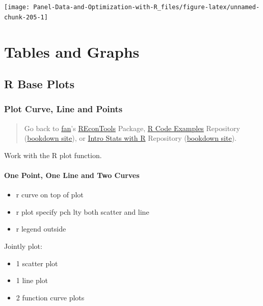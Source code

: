 \documentclass[
]{book}
\providecommand{\tightlist}{%
  \setlength{\itemsep}{0pt}\setlength{\parskip}{0pt}}
\begin{document}
\begin{center}\texttt{[image: Panel-Data-and-Optimization-with-R\_files/figure-latex/unnamed-chunk-205-1]} \end{center}

\hypertarget{tables-and-graphs}{%
\chapter{Tables and Graphs}\label{tables-and-graphs}}

\hypertarget{r-base-plots}{%
\section{R Base Plots}\label{r-base-plots}}

\hypertarget{plot-curve-line-and-points}{%
\subsection{Plot Curve, Line and Points}\label{plot-curve-line-and-points}}

\begin{quote}
Go back to \href{http://fanwangecon.github.io/}{fan}'s \href{https://fanwangecon.github.io/REconTools/}{REconTools} Package, \href{https://fanwangecon.github.io/R4Econ/}{R Code Examples} Repository (\href{https://fanwangecon.github.io/R4Econ/bookdown}{bookdown site}), or \href{https://fanwangecon.github.io/Stat4Econ/}{Intro Stats with R} Repository (\href{https://fanwangecon.github.io/Stat4Econ/bookdown}{bookdown site}).
\end{quote}

Work with the R plot function.

\hypertarget{one-point-one-line-and-two-curves}{%
\subsubsection{One Point, One Line and Two Curves}\label{one-point-one-line-and-two-curves}}

\begin{itemize}
\tightlist
\item
  r curve on top of plot
\item
  r plot specify pch lty both scatter and line
\item
  r legend outside
\end{itemize}

Jointly plot:

\begin{itemize}
\tightlist
\item
  1 scatter plot
\item
  1 line plot
\item
  2 function curve plots
\end{itemize}
\end{document}
